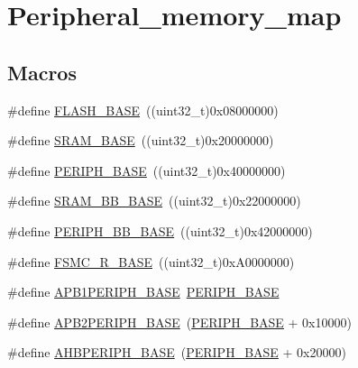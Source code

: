 \hypertarget{group___peripheral__memory__map}{}\section{Peripheral\+\_\+memory\+\_\+map}
\label{group___peripheral__memory__map}
\subsection*{Macros}
\begin{DoxyCompactItemize}
\item 
\#define \mbox{\hyperlink{group___peripheral__memory__map_ga23a9099a5f8fc9c6e253c0eecb2be8db}{F\+L\+A\+S\+H\+\_\+\+B\+A\+SE}}~((uint32\+\_\+t)0x08000000)
\item 
\#define \mbox{\hyperlink{group___peripheral__memory__map_ga05e8f3d2e5868754a7cd88614955aecc}{S\+R\+A\+M\+\_\+\+B\+A\+SE}}~((uint32\+\_\+t)0x20000000)
\item 
\#define \mbox{\hyperlink{group___peripheral__memory__map_ga9171f49478fa86d932f89e78e73b88b0}{P\+E\+R\+I\+P\+H\+\_\+\+B\+A\+SE}}~((uint32\+\_\+t)0x40000000)
\item 
\#define \mbox{\hyperlink{group___peripheral__memory__map_gad3548b6e2f017f39d399358f3ac98454}{S\+R\+A\+M\+\_\+\+B\+B\+\_\+\+B\+A\+SE}}~((uint32\+\_\+t)0x22000000)
\item 
\#define \mbox{\hyperlink{group___peripheral__memory__map_gaed7efc100877000845c236ccdc9e144a}{P\+E\+R\+I\+P\+H\+\_\+\+B\+B\+\_\+\+B\+A\+SE}}~((uint32\+\_\+t)0x42000000)
\item 
\#define \mbox{\hyperlink{group___peripheral__memory__map_gaddf0e199dccba83272b20c9fb4d3aaed}{F\+S\+M\+C\+\_\+\+R\+\_\+\+B\+A\+SE}}~((uint32\+\_\+t)0x\+A0000000)
\item 
\#define \mbox{\hyperlink{group___peripheral__memory__map_ga45666d911f39addd4c8c0a0ac3388cfb}{A\+P\+B1\+P\+E\+R\+I\+P\+H\+\_\+\+B\+A\+SE}}~\mbox{\hyperlink{group___peripheral__memory__map_ga9171f49478fa86d932f89e78e73b88b0}{P\+E\+R\+I\+P\+H\+\_\+\+B\+A\+SE}}
\item 
\#define \mbox{\hyperlink{group___peripheral__memory__map_ga25b99d6065f1c8f751e78f43ade652cb}{A\+P\+B2\+P\+E\+R\+I\+P\+H\+\_\+\+B\+A\+SE}}~(\mbox{\hyperlink{group___peripheral__memory__map_ga9171f49478fa86d932f89e78e73b88b0}{P\+E\+R\+I\+P\+H\+\_\+\+B\+A\+SE}} + 0x10000)
\item 
\#define \mbox{\hyperlink{group___peripheral__memory__map_ga92eb5d49730765d2abd0f5b09548f9f5}{A\+H\+B\+P\+E\+R\+I\+P\+H\+\_\+\+B\+A\+SE}}~(\mbox{\hyperlink{group___peripheral__memory__map_ga9171f49478fa86d932f89e78e73b88b0}{P\+E\+R\+I\+P\+H\+\_\+\+B\+A\+SE}} + 0x20000)

\end{DoxyCompactItemize}
